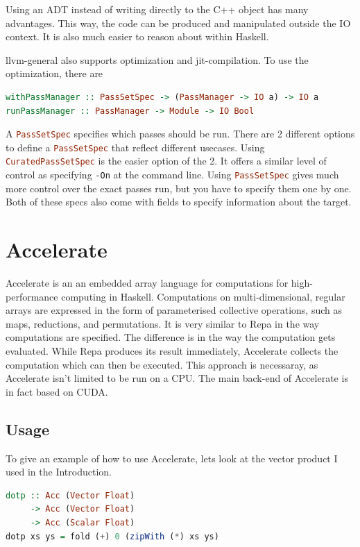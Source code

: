 \documentclass[a4paper,bibliography=totocnumbered,parskip,headsepline]{scrbook}
\begin{document}
Using an ADT instead of writing directly to the C++ object has many advantages.
This way, the code can be produced and manipulated outside the IO context.
It is also much easier to reason about within Haskell.

llvm-general also supports optimization and jit-compilation.
To use the optimization, there are
\begin{lstlisting}[language=haskell]
withPassManager :: PassSetSpec -> (PassManager -> IO a) -> IO a
runPassManager :: PassManager -> Module -> IO Bool
\end{lstlisting}
A \lstinline[language=haskell]!PassSetSpec! specifies which passes should be run.
There are 2 different options to define a \lstinline[language=haskell]!PassSetSpec! that reflect different usecases.
Using \lstinline[language=haskell]!CuratedPassSetSpec! is the easier option of the 2.
It offers a similar level of control as specifying \texttt{-On} at the command line.
Using \lstinline[language=haskell]!PassSetSpec! gives much more control over the exact passes run, but you have to specify them one by one.
Both of these specs also come with fields to specify information about the target.

\section{Accelerate}
Accelerate\cite{chakravarty2011accelerating,mcdonelloptimising} is an an embedded array language for computations for high-performance computing in Haskell.
Computations on multi-dimensional, regular arrays are expressed in the form of parameterised collective operations, such as maps, reductions, and permutations.
It is very similar to Repa\cite{keller2010regular} in the way computations are specified.
The difference is in the way the computation gets evaluated.
While Repa produces its result immediately, Accelerate collects the computation which can then be executed.
This approach is necessaray, as Accelerate isn't limited to be run on a CPU.
The main back-end of Accelerate is in fact based on CUDA.

\subsection{Usage}
To give an example of how to use Accelerate, lets look at the vector product I used in the Introduction.

\begin{lstlisting}[language=haskell]
dotp :: Acc (Vector Float)
     -> Acc (Vector Float)
     -> Acc (Scalar Float)
dotp xs ys = fold (+) 0 (zipWith (*) xs ys)
\end{lstlisting}
\end{document}
